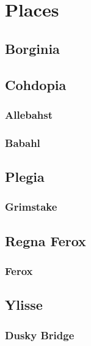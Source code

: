 \section{Places}

\subsection{Borginia}
\label{nations:borginia}

\subsection{Cohdopia}
\label{nations:cohdopia}


\subsubsection{Allebahst}
\label{nations:allebahst}

\subsubsection{Babahl}
\label{nations:babahl}


\subsection{Plegia}
\label{nations:plegia}

\subsubsection{Grimstake}
\label{places:grimstake}

\subsection{Regna Ferox}
\label{nations:ferox}

\subsubsection{Ferox}
\label{places:ferox}

\subsection{Ylisse}
\label{nations:ylisse}

\subsubsection{Dusky Bridge}
\label{places:duskybridge}

